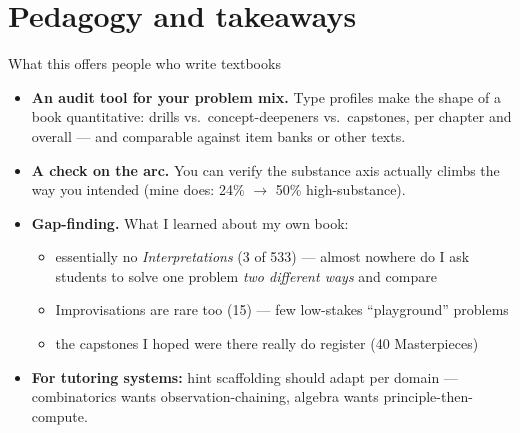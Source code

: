 \documentclass[10pt,aspectratio=169]{beamer}
\begin{document}
\section{Pedagogy and takeaways}

\begin{frame}{What this offers people who write textbooks}
  \begin{itemize}
    \item \textbf{An audit tool for your problem mix.} Type profiles make the shape of a
          book quantitative: drills vs.\ concept-deepeners vs.\ capstones, per chapter and
          overall --- and comparable against item banks or other texts.
    \item \textbf{A check on the arc.} You can verify the substance axis actually climbs
          the way you intended (mine does: 24\% $\to$ 50\% high-substance).
    \item \textbf{Gap-finding.} What I learned about my own book:
      \begin{itemize}
        \item essentially no \emph{Interpretations} (3 of 533) --- almost nowhere do I ask
              students to solve one problem \emph{two different ways} and compare
        \item Improvisations are rare too (15) --- few low-stakes ``playground'' problems
        \item the capstones I hoped were there really do register (40 Masterpieces)
      \end{itemize}
    \item \textbf{For tutoring systems:} hint scaffolding should adapt per domain ---
          combinatorics wants observation-chaining, algebra wants principle-then-compute.
  \end{itemize}
\end{frame}
\end{document}
